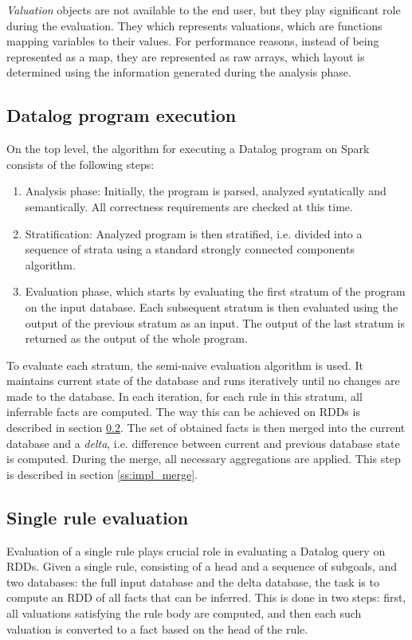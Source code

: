 \emph{Valuation} objects are not available to the end user, but they play significant role during the evaluation. They which represents valuations, which are functions mapping variables to their values. For performance reasons, instead of being represented as a map, they are represented as raw arrays, which layout is determined using the information generated during the analysis phase.

\subsection{Datalog program execution}

On the top level, the algorithm for executing a Datalog program on Spark consists of the following steps:

\begin{enumerate}
\item Analysis phase: Initially, the program is parsed, analyzed syntatically and semantically. All correctness requirements are checked at this time.

\item Stratification: Analyzed program is then stratified, i.e. divided into a sequence of strata using a standard strongly connected components algorithm.

\item Evaluation phase, which starts by evaluating the first stratum of the program on the input database. Each subsequent stratum is then evaluated using the output of the previous stratum as an input. The output of the last stratum is returned as the output of the whole program.

\end{enumerate}

To evaluate each stratum, the semi-naive evaluation algorithm is used. It maintains current state of the database and runs iteratively until no changes are made to the database. In each iteration, for each rule in this stratum, all inferrable facts are computed. The way this can be achieved on RDDs is described in section \ref{ss:impl_evalrule}. The set of obtained facts is then merged into the current database and a \emph{delta}, i.e. difference between current and previous database state is computed. During the merge, all necessary aggregations are applied. This step is described in section \ref{ss:impl_merge}.

\subsection{Single rule evaluation}\label{ss:impl_evalrule}
Evaluation of a single rule plays crucial role in evaluating a Datalog query on RDDs. Given a single rule, consisting of a head and a sequence of subgoals, and two databases: the full input database and the delta database, the task is to compute an RDD of all facts that can be inferred. This is done in two steps: first, all valuations satisfying the rule body are computed, and then each such valuation is converted to a fact based on the head of the rule.

